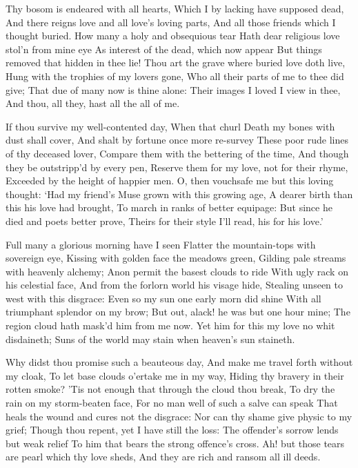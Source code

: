 \documentclass[twocolumn]{book}
\begin{document}
Thy bosom is endeared with all hearts,
Which I by lacking have supposed dead,
And there reigns love and all love's loving parts,
And all those friends which I thought buried.
How many a holy and obsequious tear
Hath dear religious love stol'n from mine eye
As interest of the dead, which now appear
But things removed that hidden in thee lie!
Thou art the grave where buried love doth live,
\numerus*{}Hung with the trophies of my lovers gone,
Who all their parts of me to thee did give;
That due of many now is thine alone:
  Their images I loved I view in thee,
  And thou, all they, hast all the all of me.


If thou survive my well-contented day,
When that churl Death my bones with dust shall cover,
And shalt by fortune once more re-survey
These poor rude lines of thy deceased lover,
Compare them with the bettering of the time,
And though they be outstripp'd by every pen,
Reserve them for my love, not for their rhyme,
Exceeded by the height of happier men.
O, then vouchsafe me but this loving thought:
`Had my friend's Muse grown with this growing age,
A dearer birth than this his love had brought,
To march in ranks of better equipage:
  But since he died and poets better prove,
  Theirs for their style I'll read, his for his love.'


Full many a glorious morning have I seen
Flatter the mountain-tops with sovereign eye,
Kissing with golden face the meadows green,
Gilding pale streams with heavenly alchemy;
Anon permit the basest clouds to ride
With ugly rack on his celestial face,
And from the forlorn world his visage hide,
Stealing unseen to west with this disgrace:
Even so my sun one early morn did shine
With all triumphant splendor on my brow;
But out, alack! he was but one hour mine;
The region cloud hath mask'd him from me now.
  Yet him for this my love no whit disdaineth;
  Suns of the world may stain when heaven's sun staineth.


Why didst thou promise such a beauteous day,
And make me travel forth without my cloak,
To let base clouds o'ertake me in my way,
Hiding thy bravery in their rotten smoke?
'Tis not enough that through the cloud thou break,
To dry the rain on my storm-beaten face,
For no man well of such a salve can speak
That heals the wound and cures not the disgrace:
Nor can thy shame give physic to my grief;
Though thou repent, yet I have still the loss:
The offender's sorrow lends but weak relief
To him that bears the strong offence's cross.
  Ah! but those tears are pearl which thy love sheds,
  And they are rich and ransom all ill deeds.
\end{document}
